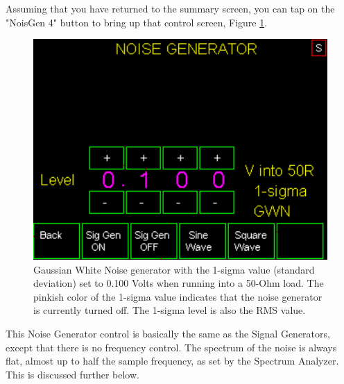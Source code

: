 Assuming that you have returned to the summary screen, you can tap on the "\textsf{NoisGen 4}" button to bring up that control screen, Figure  \ref{AVNA_024-label}.
\begin{figure}[H]
\begin{center}
\includegraphics[scale=0.75]{./images/AVNA_024.pdf}
\caption{Gaussian White Noise generator with the 1-sigma value (standard deviation) set to 0.100 Volts when running into a 50-Ohm load.  The pinkish color of the 1-sigma value indicates that the noise generator is currently turned off.  The 1-sigma level is also the RMS value.}
\label{AVNA_024-label}
\end{center}
\end{figure}
%
This Noise Generator control is basically the same as the Signal Generators, except that there is no frequency control.  The spectrum of the noise is always flat, almost up to half the sample frequency, as set by the Spectrum Analyzer.  This is discussed further below.

